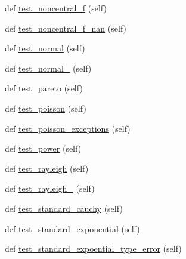 \begin{DoxyCompactItemize}
def \hyperlink{classnumpy_1_1random_1_1tests_1_1test__generator__mt19937_1_1TestRandomDist_abc7eff3c011d89eb69a0a8f5cbdc6c65}{test\+\_\+noncentral\+\_\+f} (self)
\item 
def \hyperlink{classnumpy_1_1random_1_1tests_1_1test__generator__mt19937_1_1TestRandomDist_a592e1c19aeb9ada1f5f059badd9cd9fb}{test\+\_\+noncentral\+\_\+f\+\_\+nan} (self)
\item 
def \hyperlink{classnumpy_1_1random_1_1tests_1_1test__generator__mt19937_1_1TestRandomDist_ad67c62945b09a17eebeaec6f22656028}{test\+\_\+normal} (self)
\item 
def \hyperlink{classnumpy_1_1random_1_1tests_1_1test__generator__mt19937_1_1TestRandomDist_a8354c9fe9d697d2a04a54cc12fc3a650}{test\+\_\+normal\+\_} (self)
\item 
def \hyperlink{classnumpy_1_1random_1_1tests_1_1test__generator__mt19937_1_1TestRandomDist_a731b5efecc3f18578ca2fde9af4ae2a6}{test\+\_\+pareto} (self)
\item 
def \hyperlink{classnumpy_1_1random_1_1tests_1_1test__generator__mt19937_1_1TestRandomDist_a3657480564065d7d6a6ec65c787025ee}{test\+\_\+poisson} (self)
\item 
def \hyperlink{classnumpy_1_1random_1_1tests_1_1test__generator__mt19937_1_1TestRandomDist_a57e32b6b47cdaae12787b5aa46e84532}{test\+\_\+poisson\+\_\+exceptions} (self)
\item 
def \hyperlink{classnumpy_1_1random_1_1tests_1_1test__generator__mt19937_1_1TestRandomDist_a966b296701e31e264b1591df5f1f1da5}{test\+\_\+power} (self)
\item 
def \hyperlink{classnumpy_1_1random_1_1tests_1_1test__generator__mt19937_1_1TestRandomDist_a665927a9eba683c7cacd6c4f2c19f9d0}{test\+\_\+rayleigh} (self)
\item 
def \hyperlink{classnumpy_1_1random_1_1tests_1_1test__generator__mt19937_1_1TestRandomDist_a03768313bdb6660cf61bfc9761302724}{test\+\_\+rayleigh\+\_} (self)
\item 
def \hyperlink{classnumpy_1_1random_1_1tests_1_1test__generator__mt19937_1_1TestRandomDist_a35f470c1acddf926445a934c678da158}{test\+\_\+standard\+\_\+cauchy} (self)
\item 
def \hyperlink{classnumpy_1_1random_1_1tests_1_1test__generator__mt19937_1_1TestRandomDist_af1687ce64945acd10d5ddbd810ef187d}{test\+\_\+standard\+\_\+exponential} (self)
\item 
def \hyperlink{classnumpy_1_1random_1_1tests_1_1test__generator__mt19937_1_1TestRandomDist_ac5570febdfc3c12d9d65205a708db3ce}{test\+\_\+standard\+\_\+expoential\+\_\+type\+\_\+error} (self)

\end{DoxyCompactItemize}
